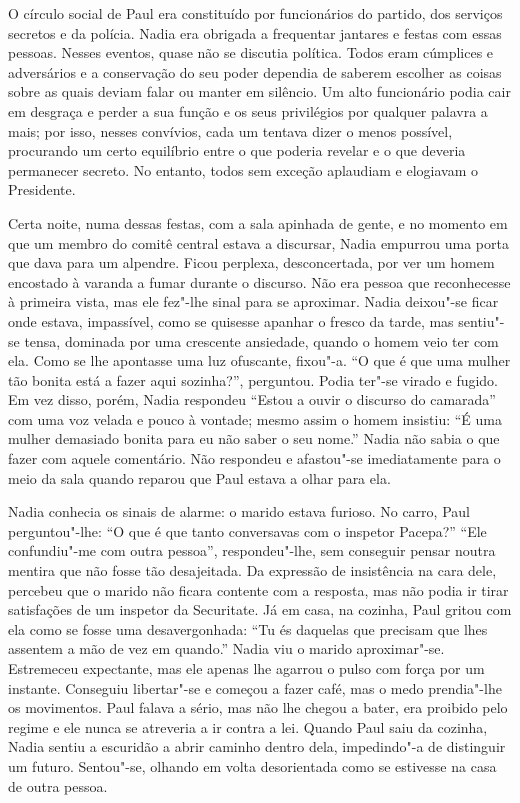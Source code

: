 O círculo social de Paul era constituído por funcionários do partido, dos serviços secretos e da polícia. Nadia era obrigada
a frequentar jantares e festas com essas pessoas. Nesses eventos,
quase não se discutia política. Todos eram cúmplices e adversários e a
conservação do seu poder dependia de saberem escolher as coisas sobre as
quais deviam falar ou manter em silêncio. Um alto funcionário podia cair
em desgraça e perder a sua função e os seus privilégios por qualquer
palavra a mais; por isso, nesses convívios, cada um tentava dizer o
menos possível, procurando um certo equilíbrio entre o que poderia revelar e o que deveria
permanecer secreto. No entanto, todos sem exceção aplaudiam e elogiavam
o Presidente.

Certa noite, numa dessas festas, com a sala apinhada de gente, e no
momento em que um membro do comitê central estava a discursar, Nadia
empurrou uma porta que dava para um alpendre. Ficou perplexa,
desconcertada, por ver um homem encostado à varanda a fumar durante o
discurso. Não era pessoa que reconhecesse à primeira vista, mas ele
fez"-lhe sinal para se aproximar. Nadia deixou"-se ficar onde estava,
impassível, como se quisesse apanhar o fresco da tarde, mas sentiu"-se
tensa, dominada por uma crescente ansiedade, quando o homem veio ter com
ela. Como se lhe apontasse uma luz ofuscante, fixou"-a.
``O que é que uma mulher tão bonita está a fazer aqui sozinha?'',
perguntou. Podia ter"-se virado e fugido. Em vez disso, porém, Nadia
respondeu ``Estou a ouvir o discurso do camarada'' com uma voz velada e
pouco à vontade; mesmo assim o homem insistiu: ``É uma mulher demasiado
bonita para eu não saber o seu nome.'' Nadia não sabia o que fazer com
aquele comentário. Não respondeu e afastou"-se imediatamente para o meio
da sala quando reparou que Paul estava a olhar para ela.

Nadia conhecia os sinais de alarme: o marido estava furioso. No carro,
Paul perguntou"-lhe: ``O que é que tanto conversavas com o inspetor
Pacepa?'' ``Ele confundiu"-me com outra pessoa'', respondeu"-lhe, sem
conseguir pensar noutra mentira que não fosse tão desajeitada. Da
expressão de insistência na cara dele, percebeu que o marido não
ficara contente com a resposta, mas não podia ir tirar
satisfações de um inspetor da Securitate. Já em casa, na cozinha, Paul
gritou com ela como se fosse uma desavergonhada: ``Tu és daquelas que
precisam que lhes assentem a mão de vez em quando.'' Nadia viu o marido
aproximar"-se. Estremeceu expectante, mas ele apenas lhe agarrou o pulso com força
por um instante. Conseguiu libertar"-se e começou a fazer café, mas o
medo prendia"-lhe os movimentos. Paul falava a sério, mas não lhe
chegou a bater, era proibido pelo regime e ele nunca se atreveria a ir
contra a lei. Quando Paul saiu da cozinha, Nadia sentiu a escuridão a
abrir caminho dentro dela, impedindo"-a de distinguir um futuro.
Sentou"-se, olhando em volta desorientada como se estivesse na casa de
outra pessoa.


